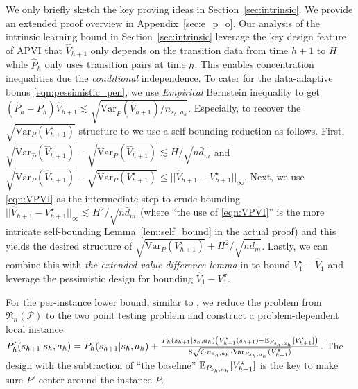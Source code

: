 We only briefly sketch the key proving ideas in Section~\ref{sec:intrinsic}. We provide an extended proof overview in Appendix~\ref{sec:e_p_o}.  
Our analysis of the intrinsic learning bound in Section~\ref{sec:intrinsic} leverage the key design feature of APVI that $\widehat{V}_{h+1}$ only depends on the transition data from time $h+1$ to $H$ while $\widehat{P}_h$ only uses transition pairs at time $h$. This enables concentration inequalities due the \emph{conditional} independence. To cater for the data-adaptive bonus \eqref{eqn:pessimistic_pen}, we use \emph{Empirical} Bernstein inequality to get {\small$(\widehat{P}_h-P_h)\widehat{V}_{h+1}\lesssim \sqrt{{\mathrm{Var}_{\hat{P}}(\widehat{V}_{h+1})}/{n_{s_h,a_h}}}$}. Especially, to recover the {\small$\sqrt{\mathrm{Var}_P(V^\star_{h+1})}$} structure to we use a self-bounding reduction as follows. First, {\small$\sqrt{{\mathrm{Var}_{\hat{P}}(\widehat{V}_{h+1})}}-\sqrt{\mathrm{Var}_P(\widehat{V}_{h+1})}\lesssim H/\sqrt{n\bar{d}_m}$} and {\small$\sqrt{\mathrm{Var}_P(\widehat{V}_{h+1})}-\sqrt{\mathrm{Var}_P({V}^\star_{h+1})}\leq ||\widehat{V}_{h+1}-V^\star_{h+1}||_\infty$}. Next, we use \eqref{eqn:VPVI} as the intermediate step to crude bounding  {\small$||\widehat{V}_{h+1}-V^\star_{h+1}||_\infty\lesssim H^2/\sqrt{n\bar{d}_m}$} (where ``the use of \eqref{eqn:VPVI}'' is the more intricate self-bounding Lemma~\ref{lem:self_bound} in the actual proof) and this yields the desired structure of {\small$\sqrt{\mathrm{Var}_P({V}^\star_{h+1})}+H^2/\sqrt{n\bar{d}_m}$}. Lastly, we can combine this with \emph{the extended value difference lemma} in \cite{cai2020provably} to bound $V_1^\star-\widehat{V}_1$ and leverage the pessimistic design for bounding $\widehat{V}_1-V_1^{\widehat{\pi}}$. 



For the per-instance lower bound, similar to \cite{khamaru2020temporal}, we reduce the problem from $\mathfrak{R}_{n}(\mathcal{P})$ to the two point testing problem and construct a problem-dependent local instance {\small$P'_h(s_{h+1}|s_h,a_h)=P_h(s_{h+1}|s_h,a_h)+\frac{P_h(s_{h+1}|s_h,a_h)\left(V_{h+1}^\star(s_{h+1})-\mathbb{E}_{P_{s_h,a_h}}[V_{h+1}^\star]\right)}{8\sqrt{\zeta\cdot n_{s_h,a_h}\cdot \mathrm{Var}_{P_{s_h,a_h}}(V_{h+1}^\star)}}$}. The design with the subtraction of ``the baseline'' $\mathbb{E}_{P_{s_h,a_h}}[V_{h+1}^\star]$ is the key to make sure $P'$ center around the instance $P$. 








